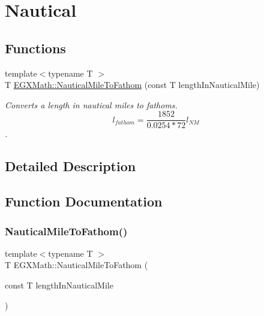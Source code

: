 \hypertarget{group___e_g_x_math-_conversions-_length_conversions-_non-_s_i-_nautical_mile-_nautical}{}\section{Nautical}
\label{group___e_g_x_math-_conversions-_length_conversions-_non-_s_i-_nautical_mile-_nautical}
\subsection*{Functions}
\begin{DoxyCompactItemize}
\item 
{\footnotesize template$<$typename T $>$ }\\T \mbox{\hyperlink{group___e_g_x_math-_conversions-_length_conversions-_non-_s_i-_nautical_mile-_nautical_ga637330d41d3e33c1cf81ebe03e538bb3}{E\+G\+X\+Math\+::\+Nautical\+Mile\+To\+Fathom}} (const T length\+In\+Nautical\+Mile)
\begin{DoxyCompactList}\small\item\em Converts a length in nautical miles to fathoms. \[ l_{fathom}= \frac{1852}{0.0254 * 72} l_{NM} \]. \end{DoxyCompactList}\end{DoxyCompactItemize}


\subsection{Detailed Description}


\subsection{Function Documentation}
\mbox{\label{group___e_g_x_math-_conversions-_length_conversions-_non-_s_i-_nautical_mile-_nautical_ga637330d41d3e33c1cf81ebe03e538bb3}} 
\subsubsection{\texorpdfstring{Nautical\+Mile\+To\+Fathom()}{NauticalMileToFathom()}}
{\footnotesize\ttfamily template$<$typename T $>$ \\
T E\+G\+X\+Math\+::\+Nautical\+Mile\+To\+Fathom (\begin{DoxyParamCaption}\item[{const T}]{length\+In\+Nautical\+Mile }\end{DoxyParamCaption})}




